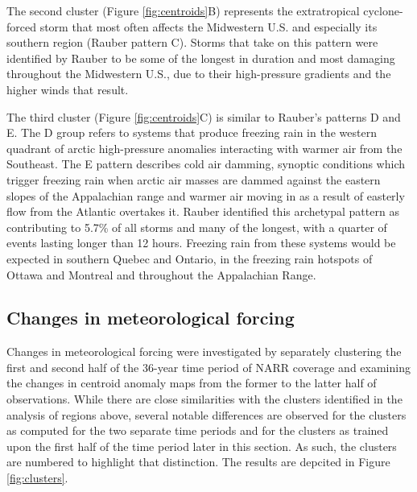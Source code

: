 \documentclass[twocol]{ametsoc}
\begin{document}
The second cluster (Figure \ref{fig:centroids}B) represents the extratropical cyclone-forced storm that most often affects the Midwestern U.S. and especially its southern region (Rauber pattern C). Storms that take on this pattern were identified by Rauber to be some of the longest in duration and most damaging throughout the Midwestern U.S., due to their high-pressure gradients and the higher winds that result. 

The third cluster (Figure \ref{fig:centroids}C) is similar to Rauber's patterns D and E. The D group refers to systems that produce freezing rain in the western quadrant of arctic high-pressure anomalies interacting with warmer air from the Southeast. The E pattern describes cold air damming, synoptic conditions which trigger freezing rain when arctic air masses are dammed against the eastern slopes of the Appalachian range and warmer air moving in as a result of easterly flow from the Atlantic overtakes it. Rauber identified this archetypal pattern as contributing to 5.7\% of all storms and many of the longest, with a quarter of events lasting longer than 12 hours. Freezing rain from these systems would be expected in southern Quebec and Ontario, in the freezing rain hotspots of Ottawa and Montreal and throughout the Appalachian Range. 

\subsection{Changes in meteorological forcing}
Changes in meteorological forcing were investigated by separately clustering the first and second half of the 36-year time period of NARR coverage and examining the changes in centroid anomaly maps from the former to the  latter half of observations. While there are close similarities with the clusters identified in the analysis of regions above, several notable differences are observed for the clusters as computed for the two separate time periods and for the clusters as trained upon the first half of the time period later in this section. As such, the clusters are numbered to highlight that distinction. The results are depcited in Figure \ref{fig:clusters}.
\end{document}
